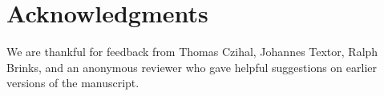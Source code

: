 \documentclass[10pt,letterpaper]{article}
\begin{document}
\section*{Acknowledgments}\label{acknowledgments}
We are thankful for feedback from Thomas Czihal, Johannes Textor, Ralph Brinks, and an anonymous reviewer who gave helpful suggestions on earlier versions of the manuscript.

\nolinenumbers

%
%
% 
%
%
%
%


\end{document}
